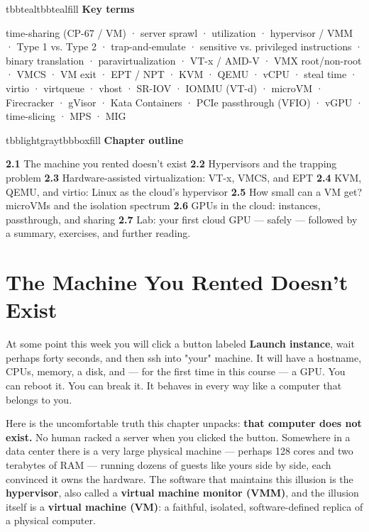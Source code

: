 \vspace{5.0pt}

\begin{calloutbox}{tbbteal}{tbbtealfill}
{\normalsize\bfseries\color{tbbteal}Key terms}\par\vspace{3pt}
time-sharing (CP-67 / VM) · server sprawl · utilization · hypervisor / VMM · Type 1 vs. Type 2 · trap-and-emulate · sensitive vs. privileged instructions · binary translation · paravirtualization · VT-x / AMD-V · VMX root/non-root · VMCS · VM exit · EPT / NPT · KVM · QEMU · vCPU · steal time · virtio · virtqueue · vhost · SR-IOV · IOMMU (VT-d) · microVM · Firecracker · gVisor · Kata Containers · PCIe passthrough (VFIO) · vGPU · time-slicing · MPS · MIG
\end{calloutbox}

\vspace{5.0pt}

\begin{calloutbox}{tbblightgray}{tbbboxfill}
{\normalsize\bfseries\color{tbbink}Chapter outline}\par\vspace{3pt}
\textbf{2.1} The machine you rented doesn't exist    \textbf{2.2} Hypervisors and the trapping problem    \textbf{2.3} Hardware-assisted virtualization: VT-x, VMCS, and EPT    \textbf{2.4} KVM, QEMU, and virtio: Linux as the cloud's hypervisor    \textbf{2.5} How small can a VM get? microVMs and the isolation spectrum    \textbf{2.6} GPUs in the cloud: instances, passthrough, and sharing    \textbf{2.7} Lab: your first cloud GPU — safely — followed by a summary, exercises, and further reading.
\end{calloutbox}

\section{The Machine You Rented Doesn't Exist}

At some point this week you will click a button labeled \textbf{Launch instance}, wait perhaps forty seconds, and then ssh into "your" machine. It will have a hostname, CPUs, memory, a disk, and — for the first time in this course — a GPU. You can reboot it. You can break it. It behaves in every way like a computer that belongs to you.

Here is the uncomfortable truth this chapter unpacks: \textbf{that computer does not exist.} No human racked a server when you clicked the button. Somewhere in a data center there is a very large physical machine — perhaps 128 cores and two terabytes of RAM — running dozens of guests like yours side by side, each convinced it owns the hardware. The software that maintains this illusion is the \textbf{hypervisor}, also called a \textbf{virtual machine monitor (VMM)}, and the illusion itself is a \textbf{virtual machine (VM)}: a faithful, isolated, software-defined replica of a physical computer.

